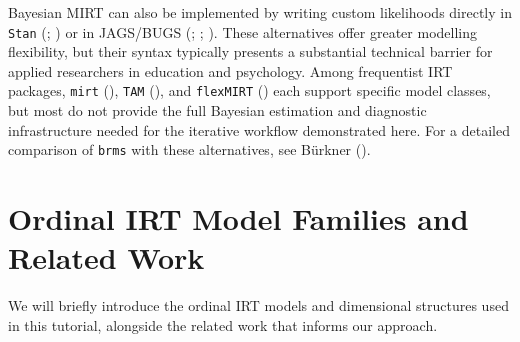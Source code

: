 \documentclass[
  man,
  floatsintext,
  longtable,
  nolmodern,
  notxfonts,
  notimes,
  colorlinks=true,linkcolor=blue,citecolor=blue,urlcolor=blue]{apa7}
\begin{document}
Bayesian MIRT can also be implemented by writing custom likelihoods
directly in \texttt{Stan} (; ) or in
JAGS/BUGS (;
;
). These alternatives offer
greater modelling flexibility, but their syntax typically presents a
substantial technical barrier for applied researchers in education and
psychology. Among frequentist IRT packages, \texttt{mirt}
(), \texttt{TAM}
(), and
\texttt{flexMIRT} ()
each support specific model classes, but most do not provide the full
Bayesian estimation and diagnostic infrastructure needed for the
iterative workflow demonstrated here. For a detailed comparison of
\texttt{brms} with these alternatives, see Bürkner
().

\section{Ordinal IRT Model Families and Related
Work}\label{ordinal-irt-model-families-and-related-work}

We will briefly introduce the ordinal IRT models and dimensional
structures used in this tutorial, alongside the related work that
informs our approach.
\end{document}
